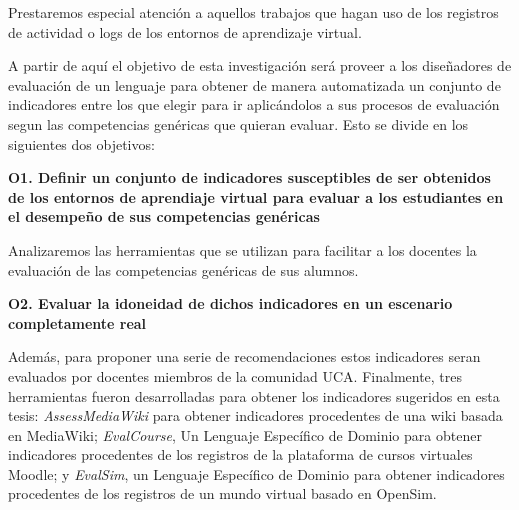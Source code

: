 Prestaremos especial atención a aquellos trabajos que hagan uso de los registros de actividad o logs de los entornos de aprendizaje virtual.

A partir de aquí el objetivo de esta investigación será proveer a los diseñadores de evaluación de un lenguaje para obtener de manera automatizada un conjunto de indicadores entre los que elegir para ir aplicándolos a sus procesos de evaluación segun las competencias genéricas que quieran evaluar. Esto se divide en los siguientes dos objetivos:
 
\bigskip
\textbf{O1. Definir un conjunto de indicadores susceptibles de ser obtenidos de los entornos de aprendiaje virtual para evaluar a los estudiantes en el desempeño de sus competencias genéricas}
\bigskip

Analizaremos las herramientas que se utilizan para facilitar a los docentes la evaluación de las competencias genéricas de sus alumnos.

\bigskip
\textbf{O2. Evaluar la idoneidad de dichos indicadores en un escenario completamente real}
\bigskip

Además, para proponer una serie de recomendaciones estos indicadores seran evaluados por docentes miembros de la comunidad UCA. Finalmente, tres herramientas fueron desarrolladas para obtener los indicadores sugeridos en esta tesis: \emph{AssessMediaWiki} para obtener indicadores procedentes de una wiki basada en MediaWiki; \emph{EvalCourse}, Un Lenguaje Específico de Dominio para obtener indicadores procedentes de los registros de la plataforma de cursos virtuales Moodle; y \emph{EvalSim}, un Lenguaje Específico de Dominio para obtener indicadores procedentes de los registros de un mundo virtual basado en OpenSim.